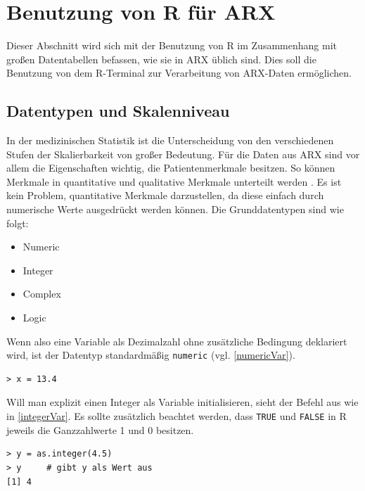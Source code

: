 \documentclass[a4paper, 12pt]{report} %
\begin{document}
\section{Benutzung von R für ARX } \label{NutzungArx}
Dieser Abschnitt wird sich mit der Benutzung von R im Zusammenhang mit großen Datentabellen befassen, wie sie in ARX üblich sind. Dies soll die Benutzung von dem R-Terminal zur Verarbeitung von ARX-Daten ermöglichen. 


\subsection{Datentypen und Skalenniveau}\label{Skalen}
In der medizinischen Statistik ist die Unterscheidung von den verschiedenen Stufen der Skalierbarkeit von großer Bedeutung. Für die Daten aus ARX sind vor allem die Eigenschaften wichtig, die Patientenmerkmale besitzen. So können Merkmale in quantitative und qualitative Merkmale unterteilt werden \cite{skalenniveau}. Es ist kein Problem, quantitative Merkmale darzustellen, da diese einfach durch numerische Werte ausgedrückt werden können. Die Grunddatentypen sind wie folgt:

\begin{itemize}
\item Numeric
\item Integer
\item Complex
\item Logic
\end{itemize}

Wenn also eine Variable als Dezimalzahl ohne zusätzliche Bedingung deklariert wird, ist der Datentyp standardmäßig \texttt{numeric} (vgl. \ref{numericVar}).

\lstset{language=R}
\begin{lstlisting}[frame=single,caption={Deklarierung einer numerischen Variable x}]
> x = 13.4
\end{lstlisting}
\label{numericVar}

Will man explizit einen Integer als Variable initialisieren, sieht der Befehl aus wie in \ref{integerVar}. Es sollte zusätzlich beachtet werden, dass \texttt{TRUE} und \texttt{FALSE} in R jeweils die Ganzzahlwerte 1 und 0 besitzen. 

\lstset{language=R}
\begin{lstlisting}[frame=single,caption={Deklarierung einer ganzzahligen Variable y}]
> y = as.integer(4.5)
> y 	# gibt y als Wert aus 
[1] 4
\end{lstlisting}
\label{integerVar}
\end{document}
